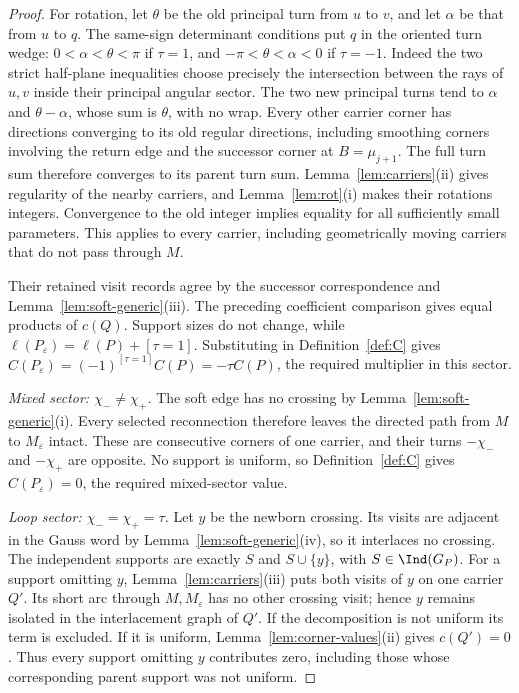 \begin{proof}
For rotation, let $\theta$ be the old principal turn from $u$ to
$v$, and let $\alpha$ be that from $u$ to $q$. The same-sign
determinant conditions put $q$ in the oriented turn wedge:
$0<\alpha<\theta<\pi$ if $\tau=1$, and
$-\pi<\theta<\alpha<0$ if $\tau=-1$.
Indeed the two strict half-plane inequalities choose precisely
the intersection between the rays of $u,v$ inside their principal
angular sector. The two new principal turns tend to $\alpha$
and $\theta-\alpha$, whose sum is $\theta$, with no wrap.
Every other carrier corner has directions converging to its old
regular directions, including smoothing corners involving the
return edge and the successor corner at $B=\mu_{j+1}$.
The full turn sum therefore converges to its parent turn sum.
Lemma~\ref{lem:carriers}(ii) gives regularity of the nearby
carriers, and Lemma~\ref{lem:rot}(i) makes their rotations
integers. Convergence to the old integer implies equality for
all sufficiently small parameters. This applies to every carrier,
including geometrically moving carriers that do not pass through $M$.

Their retained visit records agree by the successor correspondence
and Lemma~\ref{lem:soft-generic}(iii). The preceding coefficient
comparison gives equal products of $c(Q)$. Support sizes do not
change, while $\ell(P_\varepsilon)=\ell(P)+[\tau=1]$.
Substituting in Definition~\ref{def:C} gives
$C(P_\varepsilon)=(-1)^{[\tau=1]}C(P)=-\tau C(P)$,
the required multiplier in this sector.

\emph{Mixed sector: $\chi_-\ne\chi_+$.}
The soft edge has no crossing by Lemma~\ref{lem:soft-generic}(i).
Every selected reconnection therefore leaves the directed path
from $M$ to $M_\varepsilon$ intact. These are consecutive corners
of one carrier, and their turns $-\chi_-$ and $-\chi_+$ are
opposite. No support is uniform, so Definition~\ref{def:C} gives
$C(P_\varepsilon)=0$, the required mixed-sector value.

\emph{Loop sector: $\chi_-=\chi_+=\tau$.}
Let $y$ be the newborn crossing. Its visits are adjacent in the
Gauss word by Lemma~\ref{lem:soft-generic}(iv), so it interlaces
no crossing. The independent supports are exactly $S$ and
$S\cup\{y\}$, with $S\in\Ind(G_P)$.
For a support omitting $y$, Lemma~\ref{lem:carriers}(iii) puts
both visits of $y$ on one carrier $Q'$. Its short arc through
$M,M_\varepsilon$ has no other crossing visit; hence $y$ remains
isolated in the interlacement graph of $Q'$. If the decomposition
is not uniform its term is excluded. If it is uniform,
Lemma~\ref{lem:corner-values}(ii) gives $c(Q')=0$.
Thus every support omitting $y$ contributes zero, including those
whose corresponding parent support was not uniform.


\end{proof}
